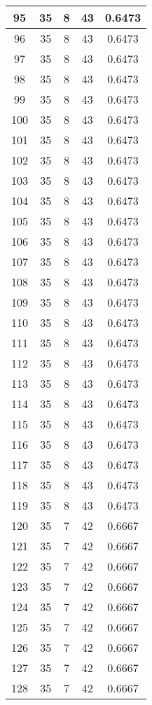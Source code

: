 \documentclass[letterpaper, 12pt]{article}
\begin{document}
\begin{longtable}{|c|c|c|c|c|}
95 & 35 & 8 & 43 & 0.6473 \\
\hline
96 & 35 & 8 & 43 & 0.6473 \\
\hline
97 & 35 & 8 & 43 & 0.6473 \\
\hline
98 & 35 & 8 & 43 & 0.6473 \\
\hline
99 & 35 & 8 & 43 & 0.6473 \\
\hline
100 & 35 & 8 & 43 & 0.6473 \\
\hline
101 & 35 & 8 & 43 & 0.6473 \\
\hline
102 & 35 & 8 & 43 & 0.6473 \\
\hline
103 & 35 & 8 & 43 & 0.6473 \\
\hline
104 & 35 & 8 & 43 & 0.6473 \\
\hline
105 & 35 & 8 & 43 & 0.6473 \\
\hline
106 & 35 & 8 & 43 & 0.6473 \\
\hline
107 & 35 & 8 & 43 & 0.6473 \\
\hline
108 & 35 & 8 & 43 & 0.6473 \\
\hline
109 & 35 & 8 & 43 & 0.6473 \\
\hline
110 & 35 & 8 & 43 & 0.6473 \\
\hline
111 & 35 & 8 & 43 & 0.6473 \\
\hline
112 & 35 & 8 & 43 & 0.6473 \\
\hline
113 & 35 & 8 & 43 & 0.6473 \\
\hline
114 & 35 & 8 & 43 & 0.6473 \\
\hline
115 & 35 & 8 & 43 & 0.6473 \\
\hline
116 & 35 & 8 & 43 & 0.6473 \\
\hline
117 & 35 & 8 & 43 & 0.6473 \\
\hline
118 & 35 & 8 & 43 & 0.6473 \\
\hline
119 & 35 & 8 & 43 & 0.6473 \\
\hline
120 & 35 & 7 & 42 & 0.6667 \\
\hline
121 & 35 & 7 & 42 & 0.6667 \\
\hline
122 & 35 & 7 & 42 & 0.6667 \\
\hline
123 & 35 & 7 & 42 & 0.6667 \\
\hline
124 & 35 & 7 & 42 & 0.6667 \\
\hline
125 & 35 & 7 & 42 & 0.6667 \\
\hline
126 & 35 & 7 & 42 & 0.6667 \\
\hline
127 & 35 & 7 & 42 & 0.6667 \\
\hline
128 & 35 & 7 & 42 & 0.6667 \\

\end{longtable}
\end{document}
